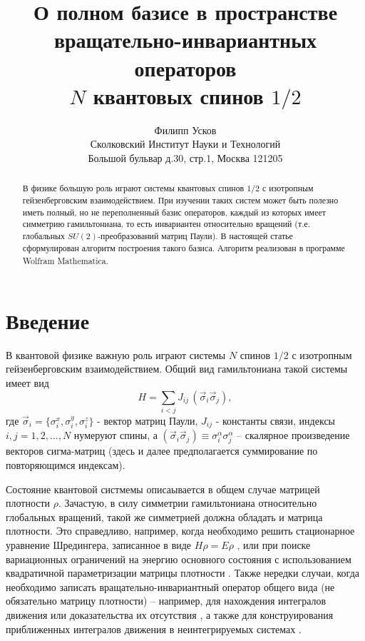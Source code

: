 \documentclass[]{article}
\title{О полном базисе  в пространстве \\ вращательно-инвариантных операторов \\ $N$ квантовых спинов $1/2$}
\author{Филипп Усков \\ {\small Сколковский Институт Науки и Технологий}\\
{\small Большой бульвар д.30, стр.1,
Москва 121205}}
\renewcommand{\[}{\begin{equation}}
\renewcommand{\]}{\end{equation}}
\begin{document}
\maketitle

\begin{abstract}
В физике большую роль играют системы квантовых спинов $1/2$ с изотропным гейзенберговским взаимодействием. При изучении таких систем может быть полезно иметь полный, но не переполненный базис операторов, каждый из которых имеет симметрию гамильтониана, то есть инвариантен относительно вращений (т.е. глобальных $SU(2)$-преобразований матриц Паули).	
В настоящей статье сформулирован алгоритм построения такого базиса. Алгоритм реализован в программе Wolfram Mathematica\textsuperscript{\textcopyright}.

\end{abstract}

\section{Введение}

В квантовой физике важную роль играют системы $N$ спинов $1/2$ с изотропным гейзенберговским взаимодействием. Общий вид гамильтониана такой системы имеет вид
\[
H=\sum_{i< j}J_{ij}\,(\vec\sigma_i\vec\sigma_j),
\label{k1}
\]
где $\vec\sigma_i = \{\sigma_i^x,\sigma_i^y,\sigma_i^z\}$ - вектор матриц Паули, $J_{ij}$ - константы связи,   индексы $i,j=1,2,...,N$ нумеруют спины, а $(\vec\sigma_i\vec\sigma_j)\equiv \sigma_i^\alpha \sigma_j^\alpha$ -- скалярное произведение векторов сигма-матриц (здесь и далее предполагается суммирование по повторяющимся индексам).

Состояние квантовой  систмемы описаывается в общем случае матрицей плотности $\rho$. Зачастую, в силу симметрии гамильтониана относительно глобальных вращений, такой же симметрией должна обладать и матрица плотности. Это справедливо, например, когда необходимо решить стационарное уравнение Шредингера, записанное в виде $ H\rho = E\rho $ \cite{USH}, или при поиске вариационных ограничений на энергию основного состояния \cite{variational} с использованием квадратичной параметризации матрицы плотности \cite{kvadro}.   Также нередки случаи, когда необходимо записать вращательно-инвариантный оператор общего вида (не обязательно матрицу плотности) -- например, для нахождения интегралов движения \cite{basisF} или доказательства их отсутствия \cite{Shiraishi}, а также для конструирования приближенных интегралов движения в неинтегрируемых системах \cite{Malikis}.
\end{document}
